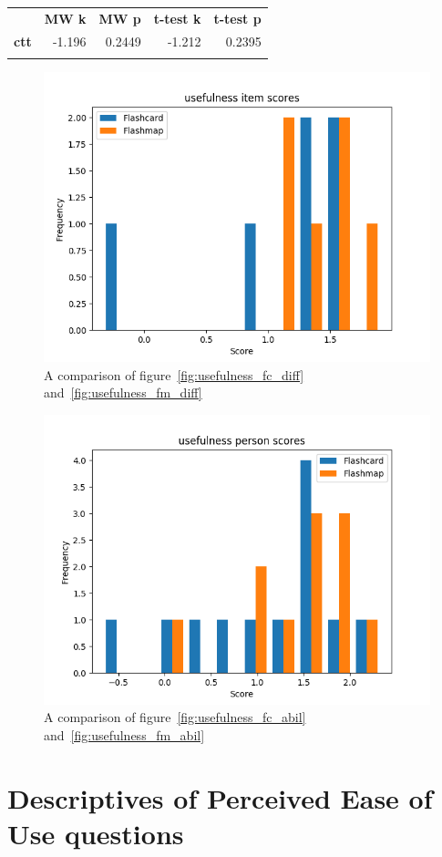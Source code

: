 \begin{longtable}[c]{@{}lrrrr@{}}
\toprule\addlinespace
& \textbf{MW k} & \textbf{MW p} &
\textbf{t-test k} & \textbf{t-test p}
\\\addlinespace
\midrule
\textbf{ctt} & -1.196 & 0.2449 & -1.212 & 0.2395
\\\addlinespace
\bottomrule
    \label{tab:usefulness_comp}
\end{longtable}

\begin{figure}
    \centering
    \includegraphics[width=.7\textwidth]{img/usefulness_diff.png}
    \caption{A comparison of figure~\protect\ref{fig:usefulness_fc_diff} and~\protect\ref{fig:usefulness_fm_diff}}
    \label{fig:usefulness_diff}
\end{figure}
\begin{figure}
    \centering
    \includegraphics[width=.7\textwidth]{img/usefulness_abil.png}
    \caption{A comparison of figure~\protect\ref{fig:usefulness_fc_abil} and~\protect\ref{fig:usefulness_fm_abil}}
    \label{fig:usefulness_abil}
\end{figure}

\FloatBarrier
\section{Descriptives of Perceived Ease of Use questions}\label{ease-of-use}

